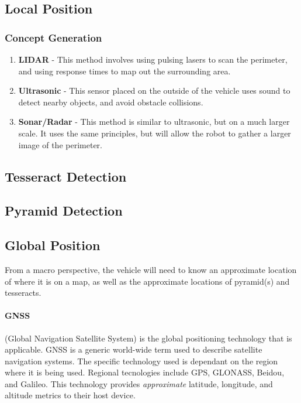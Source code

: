 \documentclass[12pt]{article}
\begin{document}
\subsection{Local Position}
\subsubsection{Concept Generation}

\begin{enumerate}
\item \textbf{LIDAR} - This method involves using pulsing lasers to scan the perimeter, and using response times to map out the surrounding area.

\item \textbf{Ultrasonic} - This sensor placed on the outside of the vehicle uses sound to detect nearby objects, and avoid obstacle collisions.

\item \textbf{Sonar/Radar} - This method is similar to ultrasonic, but on a much larger scale. It uses the same principles, but will allow the robot to gather a larger image of the perimeter.
\end{enumerate}


\subsection{Tesseract Detection}


\subsection{Pyramid Detection}
\subsection{Global Position}
From a macro perspective, the vehicle will need to know an approximate location of where it is on a map, as well as the approximate locations of pyramid(s) and tesseracts. 

\paragraph{GNSS} (Global Navigation Satellite System) is the global positioning technology that is applicable. GNSS is a generic world-wide term used to describe satellite navigation systems. The specific technology used is dependant on the region where it is being used. Regional tecnologies include GPS, GLONASS, Beidou, and Galileo.  This technology provides \textit{approximate} latitude, longitude, and altitude metrics to their host device. 
\end{document}
